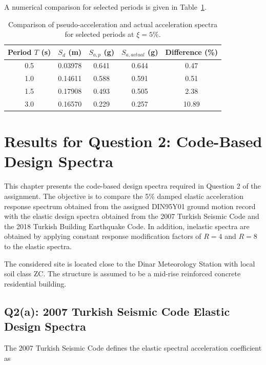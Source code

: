 ﻿\documentclass[12pt]{article}
\begin{document}
A numerical comparison for selected periods is given in Table~\ref{tab:q1_pseudo_actual_comparison}.

\begin{table}[H]
\centering
\caption{Comparison of pseudo-acceleration and actual acceleration spectra for selected periods at $\xi=5\%$.}
\label{tab:q1_pseudo_actual_comparison}
\begin{tabular}{ccccc}
\toprule
Period $T$ (s) & $S_d$ (m) & $S_{a,p}$ (g) & $S_{a,actual}$ (g) & Difference (\%) \\
\midrule
0.5 & 0.03978 & 0.641 & 0.644 & 0.47 \\
1.0 & 0.14611 & 0.588 & 0.591 & 0.51 \\
1.5 & 0.17908 & 0.493 & 0.505 & 2.38 \\
3.0 & 0.16570 & 0.229 & 0.257 & 10.89 \\
\bottomrule
\end{tabular}
\end{table}

\section{Results for Question 2: Code-Based Design Spectra}

This chapter presents the code-based design spectra required in Question 2 of the assignment. The objective is to compare the 5\% damped elastic acceleration response spectrum obtained from the assigned DIN95Y01 ground motion record with the elastic design spectra obtained from the 2007 Turkish Seismic Code and the 2018 Turkish Building Earthquake Code. In addition, inelastic spectra are obtained by applying constant response modification factors of $R=4$ and $R=8$ to the elastic spectra.

The considered site is located close to the Dinar Meteorology Station with local soil class ZC. The structure is assumed to be a mid-rise reinforced concrete residential building.

\subsection{Q2(a): 2007 Turkish Seismic Code Elastic Design Spectra}

The 2007 Turkish Seismic Code defines the elastic spectral acceleration coefficient as
\end{document}
